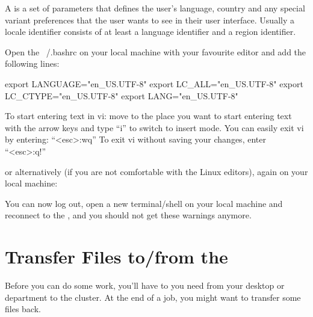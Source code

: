 A  is a set of parameters that defines the user's language,
country and any special variant preferences that the user wants to see in their
user interface. Usually a locale identifier consists of at least a language
identifier and a region identifier.

\ifmacORlinux
Open the  ~/.bashrc on your local machine with your
favourite editor and add the following lines:

\begin{prompt}
export LANGUAGE="en_US.UTF-8"
export LC_ALL="en_US.UTF-8"
export LC_CTYPE="en_US.UTF-8"
export LANG="en_US.UTF-8"
\end{prompt}

\begin{tip}[vi]
To start entering text in vi: move to the place you want to start entering text
with the arrow keys and type ``i'' to switch to insert mode.  You can easily
exit vi by entering: ``<esc>:wq''
To exit vi without saving your changes, enter ``<esc>:q!''
\end{tip}

or alternatively (if you are not comfortable with the Linux editors), again on your local machine:

\begin{prompt}
\end{prompt}

You can now log out, open a new terminal/shell on your local machine and reconnect to the \hpc, and you should not get these
warnings anymore.

\fi
\section{Transfer Files to/from the \hpc}
\label{sec:filetransfer}
\hypertarget{sec:filetransfer}{}


Before you can do some work, you'll have to 
you need from your desktop or department to the cluster. At the end of a job,
you might want to transfer some files back.

